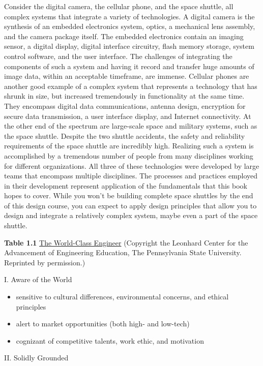 Consider the digital camera, the cellular phone, and the space shuttle,
all complex systems that integrate a variety of technologies. A digital
camera is the synthesis of an embedded electronics system, optics, a
mechanical lens assembly, and the camera package itself. The embedded
electronics contain an imaging sensor, a digital display, digital
interface circuitry, flash memory storage, system control software, and
the user interface. The challenges of integrating the components of such
a system and having it record and transfer huge amounts of image data,
within an acceptable timeframe, are immense. Cellular phones are another
good example of a complex system that represents a technology that has
shrunk in size, but increased tremendously in functionality at the same
time. They encompass digital data communications, antenna design,
encryption for secure data transmission, a user interface display, and
Internet connectivity. At the other end of the spectrum are large-scale
space and military systems, such as the space shuttle. Despite the two
shuttle accidents, the safety and reliability requirements of the space
shuttle are incredibly high. Realizing such a system is accomplished by
a tremendous number of people from many disciplines working for
different organizations. All three of these technologies were developed
by large teams that encompass multiple disciplines. The processes and
practices employed in their development represent application of the
fundamentals that this book hopes to cover. While you won't be building
complete space shuttles by the end of this design course, you can expect
to apply design principles that allow you to design and integrate a
relatively complex system, maybe even a part of the space shuttle.

\textbf{Table 1.1} \ul{The World-Class Engineer} (Copyright the Leonhard
Center for the Advancement of Engineering Education, The Pennsylvania
State University. Reprinted by permission.)

I. Aware of the World

\begin{itemize}
\item
  sensitive to cultural differences, environmental concerns, and ethical
  principles
\item
  alert to market opportunities (both high- and low-tech)
\item
  cognizant of competitive talents, work ethic, and motivation
\end{itemize}

II. Solidly Grounded

